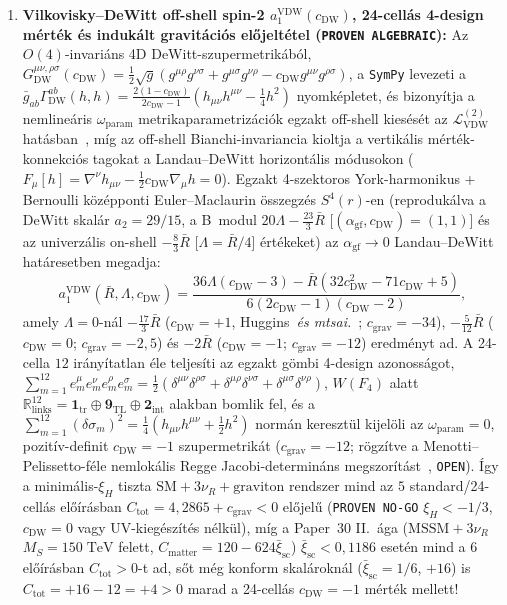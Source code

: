 \documentclass[11pt,a4paper]{article}
\begin{document}
{\begin{enumerate}
\item \textbf{Vilkovisky--DeWitt off-shell spin-2 $a_1^{\mathrm{VDW}}(c_{\mathrm{DW}})$, 24-cellás 4-design mérték és indukált gravitációs előjeltétel (\texttt{PROVEN ALGEBRAIC}):} Az $O(4)$-invariáns 4D DeWitt-szupermetrikából, $G_{\mathrm{DW}}^{\mu\nu,\rho\sigma}(c_{\mathrm{DW}})=\frac{1}{2}\sqrt{g}(g^{\mu\rho}g^{\nu\sigma}+g^{\mu\sigma}g^{\nu\rho}-c_{\mathrm{DW}}g^{\mu\nu}g^{\rho\sigma})$, a \texttt{SymPy} levezeti a $\bar g_{ab}\Gamma_{\mathrm{DW}}^{ab}(h,h)=\frac{2(1-c_{\mathrm{DW}})}{2c_{\mathrm{DW}}-1}(h_{\mu\nu}h^{\mu\nu}-\frac{1}{4}h^2)$ nyomképletet, és bizonyítja a nemlineáris $\omega_{\mathrm{param}}$ metrikaparametrizációk egzakt off-shell kiesését az $\mathcal{L}_{\mathrm{VDW}}^{(2)}$ hatásban~\cite{Vilkovisky1984}, míg az off-shell Bianchi-invariancia kioltja a vertikális mérték-konnekciós tagokat a Landau--DeWitt horizontális módusokon ($F_\mu[h]=\nabla^\nu h_{\mu\nu}-\frac{1}{2}c_{\mathrm{DW}}\nabla_\mu h=0$). Egzakt 4-szektoros York-harmonikus + Bernoulli középponti Euler--Maclaurin összegzés $S^4(r)$-en (reprodukálva a DeWitt skalár $a_2=29/15$, a B~modul $20\Lambda-\frac{23}{3}\bar R$ [$(\alpha_{\mathrm{gf}},c_{\mathrm{DW}})=(1,1)$] és az univerzális on-shell $-\frac{8}{3}\bar R$ [$\Lambda=\bar R/4$] értékeket) az $\alpha_{\mathrm{gf}}\to 0$ Landau--DeWitt határesetben megadja:
\[
a_1^{\mathrm{VDW}}(\bar R,\Lambda,c_{\mathrm{DW}}) = \frac{36\Lambda(c_{\mathrm{DW}}-3) - \bar R(32c_{\mathrm{DW}}^2 - 71c_{\mathrm{DW}} + 5)}{6(2c_{\mathrm{DW}}-1)(c_{\mathrm{DW}}-2)},
\]
amely $\Lambda=0$-nál $-\frac{17}{3}\bar R$ ($c_{\mathrm{DW}}=+1$, Huggins~\textit{és mtsai.}~\cite{Huggins1987}; $c_{\mathrm{grav}}=-34$), $-\frac{5}{12}\bar R$ ($c_{\mathrm{DW}}=0$; $c_{\mathrm{grav}}=-2{,}5$) és $-2\bar R$ ($c_{\mathrm{DW}}=-1$; $c_{\mathrm{grav}}=-12$) eredményt ad. A 24-cella $12$ irányítatlan éle teljesíti az egzakt gömbi 4-design azonosságot, $\sum_{m=1}^{12}e_m^\mu e_m^\nu e_m^\rho e_m^\sigma = \frac{1}{2}(\delta^{\mu\nu}\delta^{\rho\sigma}+\delta^{\mu\rho}\delta^{\nu\sigma}+\delta^{\mu\sigma}\delta^{\nu\rho})$, $W(F_4)$ alatt $\mathbb{R}^{12}_{\mathrm{links}}=\mathbf{1}_{\mathrm{tr}}\oplus\mathbf{9}_{\mathrm{TL}}\oplus\mathbf{2}_{\mathrm{int}}$ alakban bomlik fel, és a $\sum_{m=1}^{12}(\delta\sigma_m)^2 = \frac{1}{4}(h_{\mu\nu}h^{\mu\nu}+\frac{1}{2}h^2)$ normán keresztül kijelöli az $\omega_{\mathrm{param}}=0$, pozitív-definit $c_{\mathrm{DW}}=-1$ szupermetrikát ($c_{\mathrm{grav}}=-12$; rögzítve a Menotti--Pelissetto-féle nemlokális Regge Jacobi-determináns megszorítást~\cite{MenottiPelissetto1987}, \texttt{OPEN}). Így a minimális-$\xi_H$ tiszta $\mathrm{SM}+3\nu_R+\text{graviton}$ rendszer mind az $5$ standard/24-cellás előírásban $C_{\mathrm{tot}}=4{,}2865+c_{\mathrm{grav}}<0$ előjelű (\texttt{PROVEN NO-GO} $\xi_H<-1/3$, $c_{\mathrm{DW}}=0$ vagy UV-kiegészítés nélkül), míg a Paper~30 II.~ága ($\mathrm{MSSM}+3\nu_R$ $M_S=150\;\mathrm{TeV}$ felett, $C_{\mathrm{matter}}=120-624\bar\xi_{\mathrm{sc}}$) $\bar\xi_{\mathrm{sc}}<0{,}1186$ esetén mind a $6$ előírásban $C_{\mathrm{tot}}>0$-t ad, sőt még konform skalároknál ($\bar\xi_{\mathrm{sc}}=1/6$, $+16$) is $C_{\mathrm{tot}}=+16-12=+4>0$ marad a 24-cellás $c_{\mathrm{DW}}=-1$ mérték mellett!

\end{enumerate}}
\end{document}
